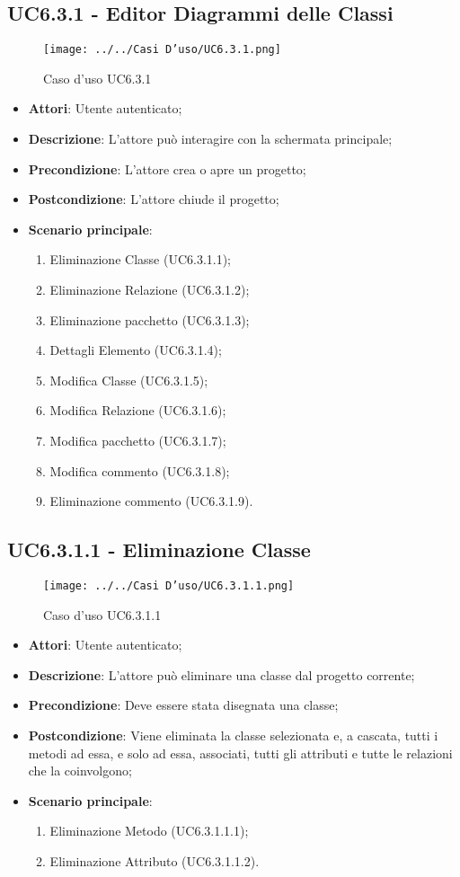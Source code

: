 \subsection{UC6.3.1 - Editor Diagrammi delle Classi} 
\label{ssec:UC6.3.1} 
\begin{figure}[h!] 
\centering 
\texttt{[image: ../../Casi D'uso/UC6.3.1.png]} 
\caption{Caso d'uso UC6.3.1} 
 \end{figure} 
\begin{itemize} 
\item \textbf{Attori}: Utente autenticato;
\item \textbf{Descrizione}: L'attore può interagire con la schermata principale;
\item \textbf{Precondizione}: L'attore crea o apre un progetto;
\item \textbf{Postcondizione}: L'attore chiude il progetto;
\item \textbf{Scenario principale}: \begin{enumerate}\item Eliminazione Classe (UC6.3.1.1);\item Eliminazione Relazione (UC6.3.1.2);\item Eliminazione pacchetto (UC6.3.1.3);\item Dettagli Elemento (UC6.3.1.4);\item Modifica Classe (UC6.3.1.5);\item Modifica Relazione (UC6.3.1.6);\item Modifica pacchetto (UC6.3.1.7);\item Modifica commento (UC6.3.1.8);\item Eliminazione commento (UC6.3.1.9). 
 \end{enumerate}
\end{itemize} 
\subsection{UC6.3.1.1 - Eliminazione Classe} 
\label{ssec:UC6.3.1.1} 
\begin{figure}[h!] 
\centering 
\texttt{[image: ../../Casi D'uso/UC6.3.1.1.png]} 
\caption{Caso d'uso UC6.3.1.1} 
 \end{figure} 
\begin{itemize} 
\item \textbf{Attori}: Utente autenticato;
\item \textbf{Descrizione}: L'attore può eliminare una classe dal progetto corrente;
\item \textbf{Precondizione}: Deve essere stata disegnata una classe;
\item \textbf{Postcondizione}: Viene eliminata la classe selezionata e, a cascata, tutti i metodi ad essa, e solo ad essa, associati, tutti gli attributi e tutte le relazioni che la coinvolgono;
\item \textbf{Scenario principale}: \begin{enumerate}\item Eliminazione Metodo (UC6.3.1.1.1);\item Eliminazione Attributo (UC6.3.1.1.2). 
 \end{enumerate}
\end{itemize} 
